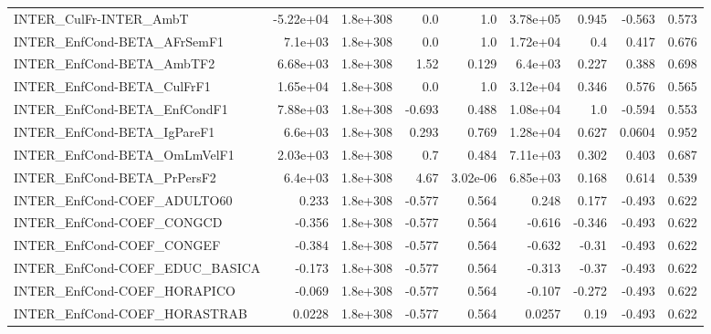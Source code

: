 \begin{tabular}{lrrrrrrrr}
INTER\_CulFr-INTER\_AmbT                &   -5.22e+04 &     1.8e+308 &     0.0 &      1.0 &   3.78e+05 &       0.945 &       -0.563 &         0.573 \\
INTER\_EnfCond-BETA\_AFrSemF1           &     7.1e+03 &     1.8e+308 &     0.0 &      1.0 &   1.72e+04 &         0.4 &        0.417 &         0.676 \\
INTER\_EnfCond-BETA\_AmbTF2             &    6.68e+03 &     1.8e+308 &    1.52 &    0.129 &    6.4e+03 &       0.227 &        0.388 &         0.698 \\
INTER\_EnfCond-BETA\_CulFrF1            &    1.65e+04 &     1.8e+308 &     0.0 &      1.0 &   3.12e+04 &       0.346 &        0.576 &         0.565 \\
INTER\_EnfCond-BETA\_EnfCondF1          &    7.88e+03 &     1.8e+308 &  -0.693 &    0.488 &   1.08e+04 &         1.0 &       -0.594 &         0.553 \\
INTER\_EnfCond-BETA\_IgPareF1           &     6.6e+03 &     1.8e+308 &   0.293 &    0.769 &   1.28e+04 &       0.627 &       0.0604 &         0.952 \\
INTER\_EnfCond-BETA\_OmLmVelF1          &    2.03e+03 &     1.8e+308 &     0.7 &    0.484 &   7.11e+03 &       0.302 &        0.403 &         0.687 \\
INTER\_EnfCond-BETA\_PrPersF2           &     6.4e+03 &     1.8e+308 &    4.67 & 3.02e-06 &   6.85e+03 &       0.168 &        0.614 &         0.539 \\
INTER\_EnfCond-COEF\_ADULTO60           &       0.233 &     1.8e+308 &  -0.577 &    0.564 &      0.248 &       0.177 &       -0.493 &         0.622 \\
INTER\_EnfCond-COEF\_CONGCD             &      -0.356 &     1.8e+308 &  -0.577 &    0.564 &     -0.616 &      -0.346 &       -0.493 &         0.622 \\
INTER\_EnfCond-COEF\_CONGEF             &      -0.384 &     1.8e+308 &  -0.577 &    0.564 &     -0.632 &       -0.31 &       -0.493 &         0.622 \\
INTER\_EnfCond-COEF\_EDUC\_BASICA        &      -0.173 &     1.8e+308 &  -0.577 &    0.564 &     -0.313 &       -0.37 &       -0.493 &         0.622 \\
INTER\_EnfCond-COEF\_HORAPICO           &      -0.069 &     1.8e+308 &  -0.577 &    0.564 &     -0.107 &      -0.272 &       -0.493 &         0.622 \\
INTER\_EnfCond-COEF\_HORASTRAB          &      0.0228 &     1.8e+308 &  -0.577 &    0.564 &     0.0257 &        0.19 &       -0.493 &         0.622 \\

\end{tabular}
